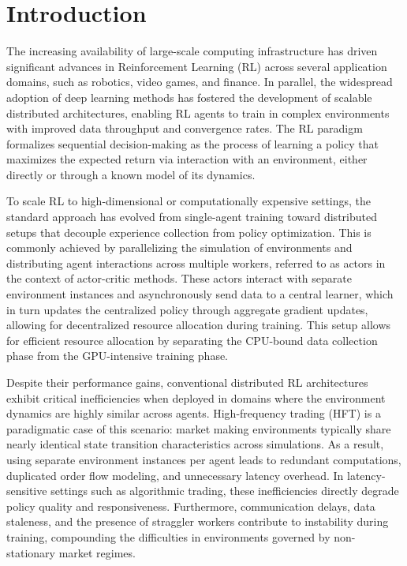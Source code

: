 
\chapter{Introduction}
\label{ch:introduction}

The increasing availability of large-scale computing infrastructure has driven significant advances
in Reinforcement Learning (RL) across several application domains, such as robotics, video games, and finance.
In parallel, the widespread adoption of deep learning methods has fostered the development of scalable distributed architectures,
enabling RL agents to train in complex environments with improved data throughput and convergence rates.
The RL paradigm formalizes sequential decision-making as the process of learning a policy that maximizes the expected return via interaction with an environment,
either directly or through a known model of its dynamics.

To scale RL to high-dimensional or computationally expensive settings, the standard approach has evolved from single-agent
training toward distributed setups that decouple experience collection from policy optimization.
This is commonly achieved by parallelizing the simulation of environments and distributing agent interactions across multiple workers,
referred to as actors in the context of actor-critic methods.
These actors interact with separate environment instances and asynchronously send data to a central learner,
which in turn updates the centralized policy through aggregate gradient updates, allowing for decentralized resource allocation during training.
This setup allows for efficient resource allocation by separating the CPU-bound data collection phase from the GPU-intensive training phase.

Despite their performance gains, conventional distributed RL architectures exhibit critical inefficiencies when
deployed in domains where the environment dynamics are highly similar across agents.
High-frequency trading (HFT) is a paradigmatic case of this scenario: market making environments typically share nearly
identical state transition characteristics across simulations.
As a result, using separate environment instances per agent leads to redundant computations, duplicated order flow modeling, and unnecessary latency overhead.
In latency-sensitive settings such as algorithmic trading, these inefficiencies directly degrade policy quality and responsiveness.
Furthermore, communication delays, data staleness, and the presence of straggler workers contribute to instability during training,
compounding the difficulties in environments governed by non-stationary market regimes.

